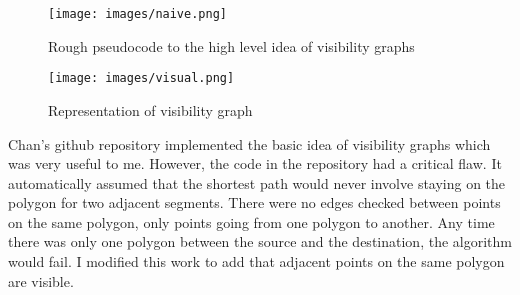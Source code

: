 \begin{figure}[h]
    \centering
    \texttt{[image: images/naive.png]}
    \caption{Rough pseudocode to the high level idea of visibility graphs}
    \label{fig:code}
\end{figure}



\begin{figure}[h]
    \centering
    \texttt{[image: images/visual.png]}
    \caption{Representation of visibility graph}
    \label{fig:visual}
\end{figure}

Chan's github repository implemented the basic idea of visibility graphs which was very useful to me. \cite{chan2018vgraph} However, the code in the repository had a critical flaw. It automatically assumed that the shortest path would never involve staying on the polygon for two adjacent segments. There were no edges checked between points on the same polygon, only points going from one polygon to another. Any time there was only one polygon between the source and the destination, the algorithm would fail. I modified this work to add that adjacent points on the same polygon are visible.
